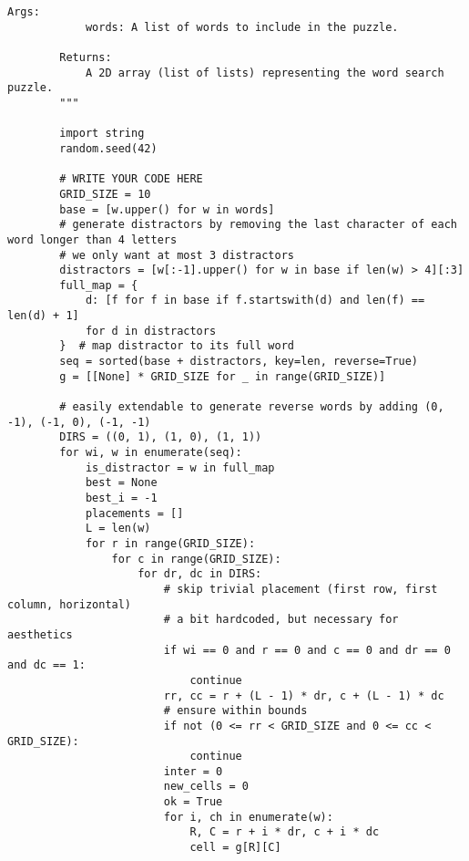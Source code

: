 \documentclass{solutionclass} %
\begin{document}
\begin{solution}
{\begin{lstlisting}[style=pythonstyle]
        Args:
            words: A list of words to include in the puzzle.
            
        Returns:
            A 2D array (list of lists) representing the word search puzzle.
        """
        
        import string
        random.seed(42)
        
        # WRITE YOUR CODE HERE
        GRID_SIZE = 10
        base = [w.upper() for w in words]
        # generate distractors by removing the last character of each word longer than 4 letters
        # we only want at most 3 distractors
        distractors = [w[:-1].upper() for w in base if len(w) > 4][:3]
        full_map = {
            d: [f for f in base if f.startswith(d) and len(f) == len(d) + 1]
            for d in distractors
        }  # map distractor to its full word
        seq = sorted(base + distractors, key=len, reverse=True)
        g = [[None] * GRID_SIZE for _ in range(GRID_SIZE)]

        # easily extendable to generate reverse words by adding (0, -1), (-1, 0), (-1, -1)
        DIRS = ((0, 1), (1, 0), (1, 1))
        for wi, w in enumerate(seq):
            is_distractor = w in full_map
            best = None
            best_i = -1
            placements = []
            L = len(w)
            for r in range(GRID_SIZE):
                for c in range(GRID_SIZE):
                    for dr, dc in DIRS:
                        # skip trivial placement (first row, first column, horizontal)
                        # a bit hardcoded, but necessary for aesthetics
                        if wi == 0 and r == 0 and c == 0 and dr == 0 and dc == 1:
                            continue
                        rr, cc = r + (L - 1) * dr, c + (L - 1) * dc
                        # ensure within bounds
                        if not (0 <= rr < GRID_SIZE and 0 <= cc < GRID_SIZE):
                            continue
                        inter = 0
                        new_cells = 0
                        ok = True
                        for i, ch in enumerate(w):
                            R, C = r + i * dr, c + i * dc
                            cell = g[R][C]


\end{lstlisting}}
\end{solution}
\end{document}
